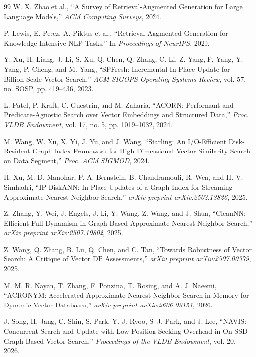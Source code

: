 \documentclass{ieeeaccess}
\begin{document}
\begin{thebibliography}{99}
W. X. Zhao et al.,
``A Survey of Retrieval-Augmented Generation for Large Language Models,''
\emph{ACM Computing Surveys}, 2024.

P. Lewis, E. Perez, A. Piktus et al.,
``Retrieval-Augmented Generation for Knowledge-Intensive NLP Tasks,''
In \emph{Proceedings of NeurIPS}, 2020.

Y. Xu, H. Liang, J. Li, S. Xu, Q. Chen, Q. Zhang, C. Li, Z. Yang, F. Yang, Y. Yang, P. Cheng, and M. Yang,
``SPFresh: Incremental In-Place Update for Billion-Scale Vector Search,''
\emph{ACM SIGOPS Operating Systems Review}, vol. 57, no. SOSP, pp. 419--436, 2023.

L. Patel, P. Kraft, C. Guestrin, and M. Zaharia,
``ACORN: Performant and Predicate-Agnostic Search over Vector Embeddings and Structured Data,''
\emph{Proc. VLDB Endowment}, vol. 17, no. 5, pp. 1019--1032, 2024.

M. Wang, W. Xu, X. Yi, J. Yu, and J. Wang,
``Starling: An I/O-Efficient Disk-Resident Graph Index Framework for High-Dimensional Vector Similarity Search on Data Segment,''
\emph{Proc. ACM SIGMOD}, 2024.

H. Xu, M. D. Manohar, P. A. Bernstein, B. Chandramouli, R. Wen, and H. V. Simhadri,
``IP-DiskANN: In-Place Updates of a Graph Index for Streaming Approximate Nearest Neighbor Search,''
\emph{arXiv preprint arXiv:2502.13826}, 2025.

Z. Zhang, Y. Wei, J. Engels, J. Li, Y. Wang, Z. Wang, and J. Shun,
``CleanNN: Efficient Full Dynamism in Graph-Based Approximate Nearest Neighbor Search,''
\emph{arXiv preprint arXiv:2507.19802}, 2025.

Z. Wang, Q. Zhang, B. Lu, Q. Chen, and C. Tan,
``Towards Robustness of Vector Search: A Critique of Vector DB Assessments,''
\emph{arXiv preprint arXiv:2507.00379}, 2025.

M. M. R. Nayan, T. Zhang, F. Ponzina, T. Rosing, and A. J. Naeemi,
``ACRONYM: Accelerated Approximate Nearest Neighbor Search in Memory for Dynamic Vector Databases,''
\emph{arXiv preprint arXiv:2606.03151}, 2026.

J. Song, H. Jang, C. Shin, S. Park, Y. J. Ryoo, S. J. Park, and J. Lee,
``NAVIS: Concurrent Search and Update with Low Position-Seeking Overhead in On-SSD Graph-Based Vector Search,''
\emph{Proceedings of the VLDB Endowment}, vol. 20, 2026.


\end{thebibliography}
\end{document}
